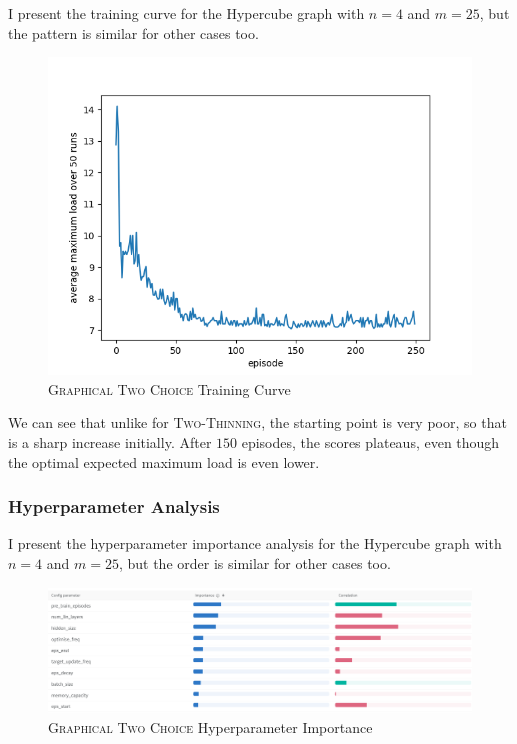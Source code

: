 I present the training curve for the Hypercube graph with $n=4$ and $m=25$, but the pattern is similar for other cases too.


\begin{figure}[h!] \label{graphical-two-choice-hyperparameter-importance}
    \centering
    \includegraphics[scale=1.0]{Chapter4/Figs/training_progression_hypercube_4_25.png}
    \caption{\textsc{Graphical Two Choice} Training Curve}
\end{figure}

We can see that unlike for \textsc{Two-Thinning}, the starting point is very poor, so that is a sharp increase initially. After $150$ episodes, the scores plateaus, even though the optimal expected maximum load is even lower.



\subsubsection{Hyperparameter Analysis}

I present the hyperparameter importance analysis for the Hypercube graph with $n=4$ and $m=25$, but the order is similar for other cases too.

\begin{figure}[h!] \label{graphical-two-choice-hyperparameter-importance}
    \centering
    \includegraphics[scale=0.4]{Chapter4/Figs/graphical_two_choice_hypercube_4_25_importance.png}
    \caption{\textsc{Graphical Two Choice} Hyperparameter Importance}
\end{figure}


